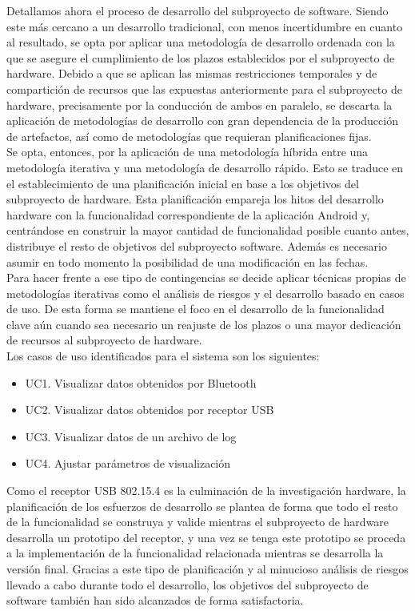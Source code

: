 	Detallamos ahora el proceso de desarrollo del subproyecto de software. Siendo este más cercano a un desarrollo tradicional, con menos incertidumbre en cuanto al resultado, se opta por aplicar una metodología de desarrollo ordenada con la que se asegure el cumplimiento de los plazos establecidos por el subproyecto de hardware. Debido a que se aplican las mismas restricciones temporales y de compartición de recursos que las expuestas anteriormente para el subproyecto de hardware, precisamente por la conducción de ambos en paralelo, se descarta la aplicación de metodologías de desarrollo con gran dependencia de la producción de artefactos, así como de metodologías que requieran planificaciones fijas.\\

	Se opta, entonces, por la aplicación de una metodología híbrida entre una metodología iterativa y una metodología de desarrollo rápido. Esto se traduce en el establecimiento de una planificación inicial en base a los objetivos del subproyecto de hardware. Esta planificación empareja los hitos del desarrollo hardware con la funcionalidad correspondiente de la aplicación Android y, centrándose en construir la mayor cantidad de funcionalidad posible cuanto antes, distribuye el resto de objetivos del subproyecto software. Además es necesario asumir en todo momento la posibilidad de una modificación en las fechas. \\

	Para hacer frente a ese tipo de contingencias se decide aplicar técnicas propias de metodologías iterativas como el análisis de riesgos y el desarrollo basado en casos de uso. De esta forma se mantiene el foco en el desarrollo de la funcionalidad clave aún cuando sea necesario un reajuste de los plazos o una mayor dedicación de recursos al subproyecto de hardware.\\

	Los casos de uso identificados para el sistema son los siguientes:

	\begin{itemize}
		\item UC1. Visualizar datos obtenidos por Bluetooth
		\item UC2. Visualizar datos obtenidos por receptor USB
		\item UC3. Visualizar datos de un archivo de log
		\item UC4. Ajustar parámetros de visualización
	\end{itemize}

	Como el receptor USB 802.15.4 es la culminación de la investigación hardware, la planificación de los esfuerzos de desarrollo se plantea de forma que todo el resto de la funcionalidad se construya y valide mientras el subproyecto de hardware desarrolla un prototipo del receptor, y una vez se tenga este prototipo se proceda a la implementación de la funcionalidad relacionada mientras se desarrolla la versión final. Gracias a este tipo de planificación y al minucioso análisis de riesgos llevado a cabo durante todo el desarrollo, los objetivos del subproyecto de software también han sido alcanzados de forma satisfactoria.\\

